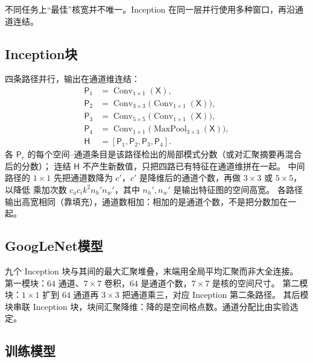 

不同任务上“最佳”核宽并不唯一。Inception 在同一层并行使用多种窗口，再沿通道连结。

\subsection{Inception块}

四条路径并行，输出在通道维连结：
\begin{align*}
\mathsf{P}_1
&=
\operatorname{Conv}_{1\times 1}(\mathsf{X}),\\
\mathsf{P}_2
&=
\operatorname{Conv}_{3\times 3}\bigl(\operatorname{Conv}_{1\times 1}(\mathsf{X})\bigr),\\
\mathsf{P}_3
&=
\operatorname{Conv}_{5\times 5}\bigl(\operatorname{Conv}_{1\times 1}(\mathsf{X})\bigr),\\
\mathsf{P}_4
&=
\operatorname{Conv}_{1\times 1}\bigl(\operatorname{MaxPool}_{3\times 3}(\mathsf{X})\bigr),\\
\mathsf{H}
&=
[\mathsf{P}_1,\mathsf{P}_2,\mathsf{P}_3,\mathsf{P}_4].
\end{align*}
各 $\mathsf{P}_r$ 的每个空间--通道条目是该路径检出的局部模式分数（或对汇聚摘要再混合后的分数）；
连结 $\mathsf{H}$ 不产生新数值，只把四路已有特征在通道维拼在一起。
中间路径的 $1\times 1$ 先把通道数降为 $c'$，$c'$ 是降维后的通道个数，再做 $3\times 3$ 或 $5\times 5$，以降低
乘加次数 $c_o c_i k^{2} n_h' n_w'$，其中 $n_h',n_w'$ 是输出特征图的空间高宽。
各路径输出高宽相同（靠填充），通道数相加：相加的是通道个数，不是把分数加在一起。

\subsection{GoogLeNet模型}

九个 Inception 块与其间的最大汇聚堆叠，末端用全局平均汇聚而非大全连接。
第一模块：$64$ 通道、$7\times 7$ 卷积，$64$ 是通道个数，$7\times 7$ 是核的空间尺寸。
第二模块：$1\times 1$ 扩到 $64$ 通道再 $3\times 3$ 把通道乘三，对应 Inception 第二条路径。
其后模块串联 Inception 块，块间汇聚降维：降的是空间格点数。通道分配比由实验选定。

\subsection{训练模型}

